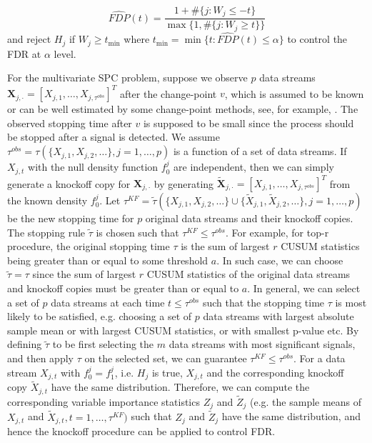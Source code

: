 \documentclass[]{interact}
\theoremstyle{plain}%
\theoremstyle{definition}
\theoremstyle{remark}
\begin{document}
\begin{equation}\label{eq1}
\widehat{FDP}(t) = \frac{1 + \# \{j: W_j \le -t\}}{\max \{1, \#\{j: W_j \ge t\}\}}
\end{equation}
and reject $H_j$ if $W_j \ge t_{\min}$ where $t_{\min} =\min \{t: \widehat{FDP}(t)  \le \alpha\}$ to control the FDR at $\alpha$ level.

For the multivariate SPC problem, suppose we observe $p$ data streams $\bm{X}_{j,\cdot} = [X_{j,1}, \ldots, X_{j,\tau^{obs}}]^T$ after the change-point $v$, which is assumed to be known or can be well estimated by some change-point methods, see, for example, \cite{zamba2006multivariate}. The observed stopping time after $v$ is supposed to be small since the process should be stopped after a signal is detected. We assume $\tau^{obs} = \tau \left( \{X_{j,1}, X_{j,2}, \ldots\}, j=1, \ldots, p \right)$ is a function of a set of data streams. If $X_{j,t}$ with the null density function $f_0^j$ are independent, then we can simply generate a knockoff copy for $\bm X_{j,\cdot}$ by generating $\bm{\tilde X}_{j,\cdot} = [X_{j,1}, \ldots, X_{j,\tau^{obs}}]^T$ from the known density $f_0^j$. Let $\tau^{KF}=\tilde \tau (\{ X_{j,1}, X_{j,2}, \ldots\} \cup \{ \tilde X_{j,1},\tilde X_{j,2},\ldots\}, j=1, \ldots, p)$ be the new stopping time for $p$ original data streams and their knockoff copies. The stopping rule $\tilde \tau$ is chosen such that $\tau^{KF} \le \tau^{obs}$. For example, for top-r procedure, the original stopping time $\tau$ is the sum of largest $r$ CUSUM statistics being greater than or equal to some threshold $a$. In such case, we can choose $\tilde\tau=\tau$ since the sum of largest $r$ CUSUM statistics of the original data streams and knockoff copies must be greater than or equal to $a$. In general, we can select a set of $p$ data streams at each time $t \le \tau^{obs}$ such that the stopping time $\tau$ is most likely to be satisfied, e.g. choosing a set of $p$ data streams with largest absolute sample mean or with largest CUSUM statistics, or with smallest p-value etc. By defining $\tilde \tau$ to be first selecting the $m$ data streams with most significant signals, and then apply $\tau$ on the selected set, we can guarantee $\tau^{KF} \le \tau^{obs}$. For a data stream $X_{j,t}$ with $f_0^j = f_1^j$, i.e. $H_j$ is true, $X_{j,t}$ and the corresponding knockoff copy $\tilde X_{j,t}$ have the same distribution. Therefore, we can compute the corresponding variable importance statistics $Z_j$ and $\tilde Z_j$ (e.g. the sample means of $X_{j,t}$ and $\tilde X_{j,t}, t=1, \ldots, \tau^{KF})$ such that $Z_j$ and $\tilde Z_j$ have the same distribution, and hence the knockoff procedure can be applied to control FDR.
\end{document}
